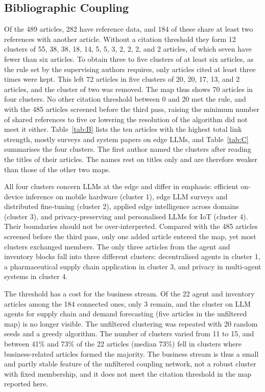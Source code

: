 \subsection{Bibliographic Coupling}
Of the 489 articles, 282 have reference data, and 184 of these share at least two references with another article. Without a citation threshold they form 12 clusters of 55, 38, 38, 18, 14, 5, 5, 3, 2, 2, 2, and 2 articles, of which seven have fewer than six articles. To obtain three to five clusters of at least six articles, as the rule set by the supervising authors requires, only articles cited at least three times were kept. This left 72 articles in five clusters of 20, 20, 17, 13, and 2 articles, and the cluster of two was removed. The map thus shows 70 articles in four clusters. No other citation threshold between 0 and 20 met the rule, and with the 485 articles screened before the third pass, raising the minimum number of shared references to five or lowering the resolution of the algorithm did not meet it either. Table~\ref{tab:B} lists the ten articles with the highest total link strength, mostly surveys and system papers on edge LLMs, and Table~\ref{tab:C} summarises the four clusters. The first author named the clusters after reading the titles of their articles. The names rest on titles only and are therefore weaker than those of the other two maps.



All four clusters concern LLMs at the edge and differ in emphasis: efficient on-device inference on mobile hardware (cluster 1), edge LLM surveys and distributed fine-tuning (cluster 2), applied edge intelligence across domains (cluster 3), and privacy-preserving and personalised LLMs for IoT (cluster 4). Their boundaries should not be over-interpreted. Compared with the 485 articles screened before the third pass, only one added article entered the map, yet most clusters exchanged members. The only three articles from the agent and inventory blocks fall into three different clusters: decentralised agents in cluster 1, a pharmaceutical supply chain application in cluster 3, and privacy in multi-agent systems in cluster 4.



The threshold has a cost for the business stream. Of the 22 agent and inventory articles among the 184 connected ones, only 3 remain, and the cluster on LLM agents for supply chain and demand forecasting (five articles in the unfiltered map) is no longer visible. The unfiltered clustering was repeated with 20 random seeds and a greedy algorithm. The number of clusters varied from 11 to 15, and between 41\% and 73\% of the 22 articles (median 73\%) fell in clusters where business-related articles formed the majority. The business stream is thus a small and partly stable feature of the unfiltered coupling network, not a robust cluster with fixed membership, and it does not meet the citation threshold in the map reported here.

